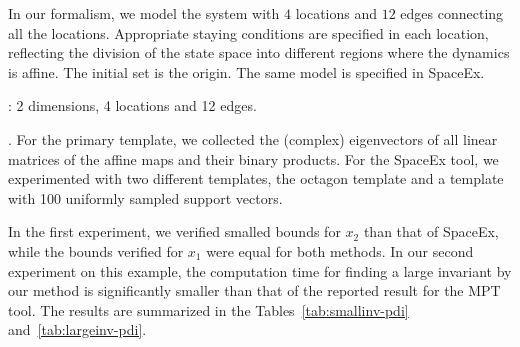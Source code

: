 In our formalism, we model the system with $4$ locations and $12$
edges connecting all the locations.  Appropriate staying conditions
are specified in each location, reflecting the division of the state
space into different regions where the dynamics is affine. The initial
set is the origin. The same model is specified in SpaceEx.

: 2 dimensions, 4 locations and 12 edges.

.  For the primary template, we collected the
(complex) eigenvectors of all linear matrices of the affine maps and
their binary products. For the SpaceEx tool, we experimented with two
different templates, the octagon template and a template with 100
uniformly sampled support vectors.

  In the first experiment, we verified smalled bounds
for $x_2$ than that of SpaceEx, while the bounds verified for $x_1$
were equal for both methods.  In our second experiment on this
example, the computation time for finding a large invariant by our
method is significantly smaller than that of the reported result for
the MPT tool.  The results are summarized in the
Tables~\ref{tab:smallinv-pdi} and~\ref{tab:largeinv-pdi}.
